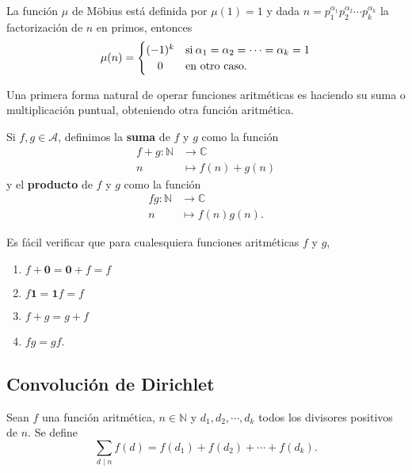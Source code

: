 \begin{definition}
La función $\mu$ de Möbius está definida por $\mu(1)=1$ y dada $n=p_1^{\alpha_1}p_2^{\alpha_2}\cdots p_k^{\alpha_k}$ la factorización de $n$ en primos, entonces
\begin{equation*}
	\mu(n) =
		\begin{cases}
			(-1)^k & \text{si} \: \alpha_1=\alpha_2=\cdots=\alpha_k=1 \\ \hfil
			0 & \text{en otro caso.}
		\end{cases}
\end{equation*}
\end{definition}

Una primera forma natural de operar funciones aritméticas es haciendo su suma o multiplicación puntual, obteniendo otra función aritmética.

\begin{definition}
Si $f,g \in \mathcal{A}$, definimos la \textbf{suma} de $f$ y $g$ como la función \begin{align*}
    f+g : \mathbb{N} & \longrightarrow \mathbb{C} \\
    n & \longmapsto f(n)+g(n)
\end{align*}
y el \textbf{producto} de $f$ y $g$ como la función
\begin{align*}
    fg : \mathbb{N} & \longrightarrow \mathbb{C} \\
    n & \longmapsto f(n)g(n).
\end{align*}
\end{definition}

Es fácil verificar que para cualesquiera funciones aritméticas $f$ y $g$,
\begin{enumerate}[label=\textnormal{(\roman*)}]
\item $f+\mathbf{0}=\mathbf{0}+f=f$ 
\item $f\mathbf{1}=\mathbf{1}f=f$ 
\item $f+g=g+f$
\item $fg=gf$.
\end{enumerate}

\subsection{Convolución de Dirichlet}

\begin{definition}
Sean $f$ una función aritmética, $n\in\mathbb{N}$ y $d_1,d_2,\cdots,d_k$ todos los divisores positivos de $n$. Se define 
\begin{equation*}
	\sum_{d \mid n} f(d)=f(d_1)+f(d_2)+\cdots+f(d_k).
\end{equation*}
\end{definition}

